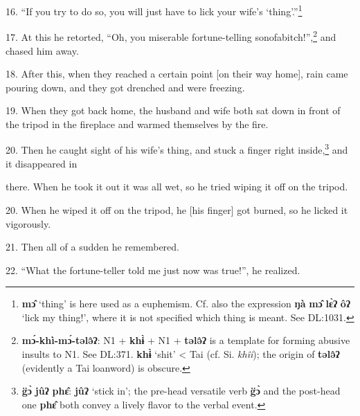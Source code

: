 16. ``If you try to do so, you will just have to lick your wife's `thing'.''\footnote{\textbf{mɔ̂} `thing' is here used as a euphemism. Cf. also the expression \textbf{ŋà} \textbf{mɔ̂} \textbf{lɛ̀ʔ} \textbf{ôʔ} `lick my thing!', where it is not specified which thing is meant. See DL:1031.}

17. At this he retorted, ``Oh, you miserable fortune-telling sonofabitch!'',\footnote{\textbf{mɔ́-khì-mɔ́-tələ̂ʔ}: N1 + \textbf{khɨ̀} + N1 +\textbf{ tələ̂ʔ} is a template for forming abusive insults to N1. See DL:371. \textbf{khɨ̀} `shit' < Tai (cf. Si. \textit{khîi}); the origin of \textbf{tələ̂ʔ }(evidently a Tai loanword) is obscure.}
and chased him away.

18. After this, when they reached a certain point [on their way home], rain came
pouring down, and they got drenched and were freezing.

19. When they got back home, the husband and wife both sat down in front of the
tripod in the fireplace and warmed themselves by the fire.

20. Then he caught sight of his wife's thing, and stuck a finger right inside,\footnote{\textbf{g̈ɔ̀} \textbf{jûʔ} \textbf{phɛ̂}: \textbf{jûʔ} `stick in'; the pre-head versatile verb \textbf{g̈ɔ̀} and the post-head one \textbf{phɛ̂} both convey a lively flavor to the verbal event.}
and it disappeared in

there. When he took it out it was all wet, so he tried wiping it off on the tripod.

20. When he wiped it off on the tripod, he [his finger] got burned, so he licked
it vigorously.

21. Then all of a sudden he remembered.

22. ``What the fortune-teller told me just now was true!'', he realized.

